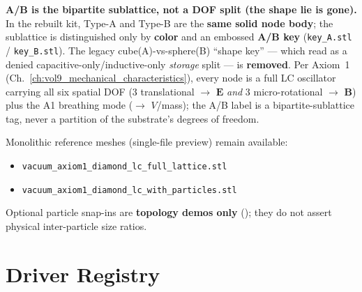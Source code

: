 \textbf{A/B is the bipartite sublattice, not a DOF split (the shape lie is gone).} In the rebuilt kit, Type-A and Type-B are the \textbf{same solid node body}; the sublattice is distinguished only by \textbf{color} and an embossed \textbf{A/B key} (\texttt{key\_A.stl} / \texttt{key\_B.stl}). The legacy cube(A)-vs-sphere(B) ``shape key'' --- which read as a denied capacitive-only/inductive-only \emph{storage} split --- is \textbf{removed}. Per Axiom~1 (Ch.~\ref{ch:vol9_mechanical_characteristics}), every node is a full LC oscillator carrying all six spatial DOF (3 translational $\to$ $\mathbf{E}$ \emph{and} 3 micro-rotational $\to$ $\mathbf{B}$) plus the A1 breathing mode ($\to$ $V$/mass); the A/B label is a bipartite-sublattice tag, never a partition of the substrate's degrees of freedom.

Monolithic reference meshes (single-file preview) remain available:
\begin{itemize}
    \item \texttt{vacuum\_axiom1\_diamond\_lc\_full\_lattice.stl}
    \item \texttt{vacuum\_axiom1\_diamond\_lc\_with\_particles.stl}
\end{itemize}
Optional particle snap-ins are \textbf{topology demos only} (); they do not assert physical inter-particle size ratios.

\section{Driver Registry}
\label{sec:vol9_exp_prints_drivers}

